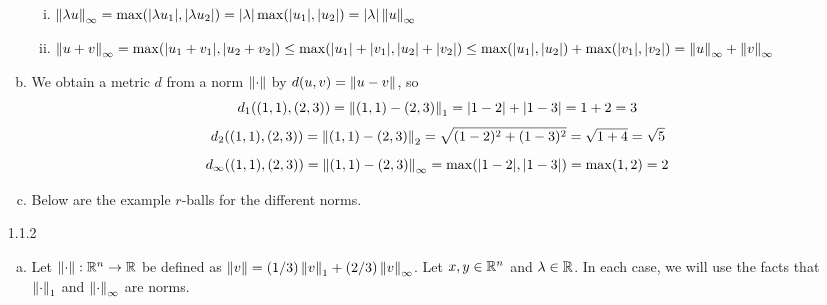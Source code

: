 \documentclass[../../Solutions.tex]{subfiles}
\begin{document}
\begin{itemize}
\begin{enumerate}[(a)]
\begin{enumerate}[(i)]
					\item $\left\lVert\lambda u\right\rVert_\infty = \max(|\lambda u_1|,|\lambda u_2|) = |\lambda|\max(|u_1|,|u_2|) = |\lambda|\left\lVert u\right\rVert_\infty$
					\item $\left\lVert u+v\right\rVert_\infty = \max(|u_1+v_1|,|u_2+v_2|) \leq \max(|u_1|+|v_1|,|u_2|+|v_2|) \leq \max(|u_1|,|u_2|)+\max(|v_1|,|v_2|) = \left\lVert u\right\rVert_\infty+\left\lVert v\right\rVert_\infty$
				\end{enumerate}
			\item We obtain a metric $d$ from a norm $\left\lVert\cdot\right\rVert$ by $d(u,v) = \left\lVert u-v\right\rVert$, so
				$$ d_1((1,1),(2,3)) = \left\lVert(1,1)-(2,3)\right\rVert_1 = |1-2|+|1-3| = 1+2 = 3 $$
				$$ d_2((1,1),(2,3)) = \left\lVert(1,1)-(2,3)\right\rVert_2 = \sqrt{(1-2)^2+(1-3)^2} = \sqrt{1+4} = \sqrt{5} $$
				$$ d_\infty((1,1),(2,3)) = \left\lVert(1,1)-(2,3)\right\rVert_\infty = \max(|1-2|,|1-3|) = \max(1,2) = 2 $$
			\item Below are the example $r$-balls for the different norms.
			\begin{figure}[htp] %
				\begin{center}
					
				\end{center}
			\end{figure}
		\end{enumerate}
	
	\item [1.1.2]
		\begin{enumerate}[(a)]
			\item Let $\left\lVert\cdot\right\rVert:\mathbb{R}^n \to \mathbb{R}$ be defined as $\left\lVert v\right\rVert = (1/3)\left\lVert v\right\rVert_1+(2/3)\left\lVert v\right\rVert_\infty$.
				Let $x,y \in \mathbb{R}^n$ and $\lambda \in \mathbb{R}$.
				In each case, we will use the facts that $\left\lVert\cdot\right\rVert_1$ and $\left\lVert\cdot\right\rVert_\infty$ are norms.
				

\end{enumerate}
\end{itemize}
\end{document}
